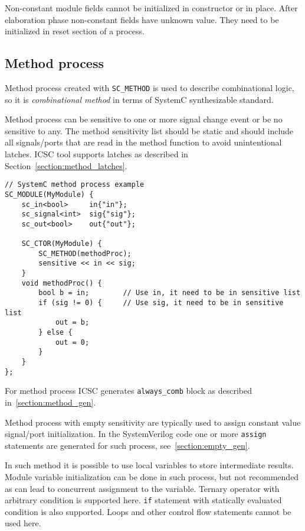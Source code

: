 Non-constant module fields cannot be initialized in constructor or in place. After elaboration phase non-constant fields have unknown value. They need to be initialized in reset section of a process. 

\subsection{Method process}

Method process created with {\tt SC\_METHOD} is used to describe combinational logic, so it is \emph{combinational method} in terms of SystemC synthesizable standard. 

Method process can be sensitive to one or more signal change event or be no sensitive to any. The method sensitivity list should be static and should include all signals/ports that are read in the method function to avoid unintentional latches. ICSC tool supports latches as described in Section~\ref{section:method_latches}. 

\begin{lstlisting}[style=mycpp]
// SystemC method process example
SC_MODULE(MyModule) {
    sc_in<bool>     in{"in"};
    sc_signal<int>  sig{"sig"};
    sc_out<bool>    out{"out"};
    
    SC_CTOR(MyModule) {
        SC_METHOD(methodProc);
        sensitive << in << sig;
    }    
    void methodProc() {
    	bool b = in;        // Use in, it need to be in sensitive list
        if (sig != 0) {     // Use sig, it need to be in sensitive list
    	    out = b;
        } else {
            out = 0;
        }
    }
};
\end{lstlisting}
%
For method process ICSC generates {\tt always\_comb} block as described in~\ref{section:method_gen}.

Method process with empty sensitivity are typically used to assign constant value signal/port initialization. In the SystemVerilog code one or more {\tt assign} statements are generated for such process, see~\ref{section:empty_gen}. 

In such method it is possible to use local variables to store intermediate results. Module variable initialization can be done in such process, but not recommended as can lead to concurrent assignment to the variable. Ternary operator with arbitrary condition is supported here. {\tt if} statement with statically evaluated condition is also supported. Loops and other control flow statements cannot be used here.

